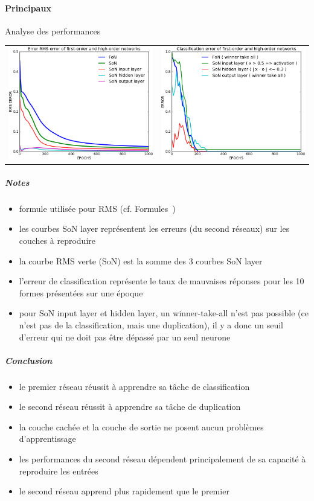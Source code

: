    \paragraph{Principaux}
      Analyse des performances
      \begin{center}
	\begin{tabular}{lr}
	  \hspace*{-1cm}
	  \includegraphics[width=250px]{data/expA1/rms.png}
	  &
	  \includegraphics[width=250px]{data/expA1/err.png} 
	\end{tabular}
      \end{center}
      \subparagraph{Notes}
	\begin{itemize}
	  \item formule utilisée pour RMS (cf. Formules~)
	  \item les courbes SoN layer représentent les erreurs (du second réseaux) sur les couches à reproduire 
	  \item la courbe RMS verte (SoN) est la somme des 3 courbes SoN layer
	  \item l'erreur de classification représente le taux de mauvaises réponses pour les 10 formes présentées sur une époque
	  \item pour SoN input layer et hidden layer, un winner-take-all n'est pas possible (ce n'est pas de la classification, 
	  mais une duplication), il y a donc un seuil d'erreur qui ne doit pas être dépassé par un seul neurone
	\end{itemize}
      \subparagraph{Conclusion}
	\begin{itemize}
	  \item le premier réseau réussit à apprendre sa tâche de classification
	  \item le second réseau réussit à apprendre sa tâche de duplication
	  \item la couche cachée et la couche de sortie ne posent aucun problèmes d'apprentissage
	  \item les performances du second réseau dépendent principalement de sa capacité à reproduire les entrées
	  \item le second réseau apprend plus rapidement que le premier
	\end{itemize}
